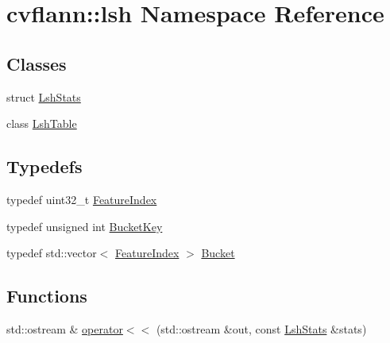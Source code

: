 \hypertarget{namespacecvflann_1_1lsh}{\section{cvflann\-:\-:lsh Namespace Reference}
\label{namespacecvflann_1_1lsh}
}
\subsection*{Classes}
\begin{DoxyCompactItemize}
\item 
struct \hyperlink{structcvflann_1_1lsh_1_1LshStats}{Lsh\-Stats}
\item 
class \hyperlink{classcvflann_1_1lsh_1_1LshTable}{Lsh\-Table}
\end{DoxyCompactItemize}
\subsection*{Typedefs}
\begin{DoxyCompactItemize}
\item 
typedef uint32\-\_\-t \hyperlink{namespacecvflann_1_1lsh_a0df25a3670e022e391bb426c0bd9134d}{Feature\-Index}
\item 
typedef unsigned int \hyperlink{namespacecvflann_1_1lsh_a798313f0f282f24b311c4cc90e2a6619}{Bucket\-Key}
\item 
typedef std\-::vector$<$ \hyperlink{namespacecvflann_1_1lsh_a0df25a3670e022e391bb426c0bd9134d}{Feature\-Index} $>$ \hyperlink{namespacecvflann_1_1lsh_aef9e4f70918d6013ff72020141fa03d0}{Bucket}
\end{DoxyCompactItemize}
\subsection*{Functions}
\begin{DoxyCompactItemize}
\item 
std\-::ostream \& \hyperlink{namespacecvflann_1_1lsh_ad142544735030a5ae8ed4614163f7694}{operator$<$$<$} (std\-::ostream \&out, const \hyperlink{structcvflann_1_1lsh_1_1LshStats}{Lsh\-Stats} \&stats)
\end{DoxyCompactItemize}


